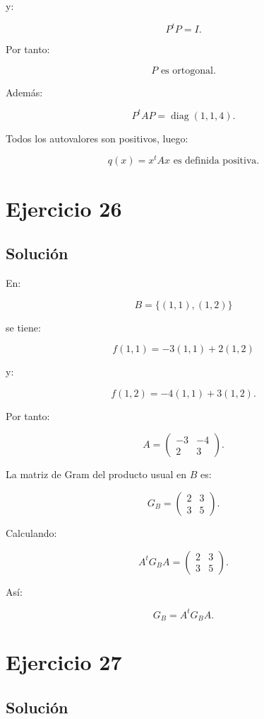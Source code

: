 \documentclass[11pt,a4paper]{article}
\newcommand{\diag}{\operatorname{diag}}
\begin{document}
y:

\[
P^tP=I.
\]

Por tanto:

\[
\boxed{P\text{ es ortogonal}.}
\]

Además:

\[
\boxed{
P^tAP=
\diag(1,1,4).
}
\]

Todos los autovalores son positivos, luego:

\[
\boxed{
q(x)=x^tAx
\text{ es definida positiva}.
}
\]

\section{Ejercicio 26}
\subsection{Solución}

En:

\[
B=\{(1,1),(1,2)\}
\]

se tiene:

\[
f(1,1)
=
-3(1,1)+2(1,2)
\]

y:

\[
f(1,2)
=
-4(1,1)+3(1,2).
\]

Por tanto:

\[
A=
\begin{pmatrix}
-3&-4\\
2&3
\end{pmatrix}.
\]

La matriz de Gram del producto usual en $B$ es:

\[
G_B=
\begin{pmatrix}
2&3\\
3&5
\end{pmatrix}.
\]

Calculando:

\[
A^tG_BA
=
\begin{pmatrix}
2&3\\
3&5
\end{pmatrix}.
\]

Así:

\[
\boxed{
G_B=A^tG_BA.
}
\]

\section{Ejercicio 27}
\subsection{Solución}
\end{document}
